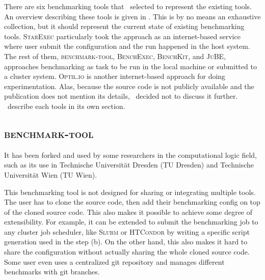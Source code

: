 There are six benchmarking tools that \first~selected to represent the existing tools.
An overview describing these tools is given in .
This is by no means an exhaustive collection, but it should represent the current state of existing benchmarking tools.
\textsc{StarExec} particularly took the approach as an internet-based service where user submit the configuration and the run happened in the host system.
The rest of them, \textsc{benchmark-tool}, \textsc{BenchExec}, \textsc{BenchKit}, and \textsc{JuBE}, approaches benchmarking as task to be run in the local machine or submitted to a cluster system.
\textsc{Optil.io} \citep{wasikOptilIoCloud2016a} is another internet-based approach for doing experimentation.
Alas, because the source code is not publicly available and the publication does not mention its details, \first~decided not to discuss it further.
\First~describe each tools in its own section.

\subsection{\textsc{benchmark-tool}}

It has been forked and used by some researchers in the computational logic field, such as its use in Technische Universit\"at Dresden (TU Dresden) and Technische Universit\"at Wien (TU Wien).


This benchmarking tool is not designed for sharing or integrating multiple tools.
The user has to clone the source code, then add their benchmarking config on top of the cloned source code.
This also makes it possible to achieve some degree of extensibility.
For example, it can be extended to submit the benchmarking job to any cluster job scheduler, like \textsc{Slurm} \citep{yoo2003slurm} or \textsc{HTCondor} \citep{condor-practice} by writing a specific script generation used in the step (b).
On the other hand, this also makes it hard to share the configuration without actually sharing the whole cloned source code.
Some user even uses a centralized git repository and manages different benchmarks with git branches.

